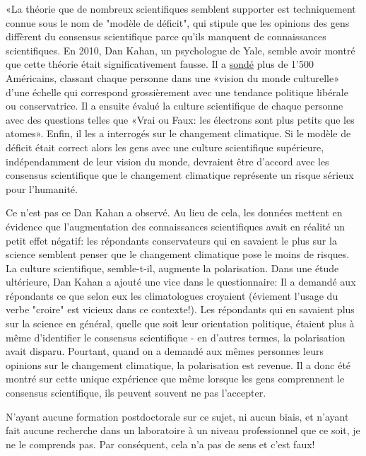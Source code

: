 	«La th\'eorie que de nombreux scientifiques semblent supporter est techniquement connue sous le nom de "modèle de d\'eficit", qui stipule que les opinions des gens diffèrent du consensus scientifique parce qu'ils manquent de connaissances scientifiques. En 2010, Dan Kahan, un psychologue de Yale, semble avoir montr\'e que cette th\'eorie \'etait significativement fausse. Il a \href{http://www.nature.com/nclimate/journal/v2/n10/full/nclimate1547.html}{{\color{blue} sond\'e}} plus de 1'500 Am\'ericains, classant chaque personne dans une «vision du monde culturelle» d'une \'echelle qui correspond grossièrement avec une tendance politique lib\'erale ou conservatrice. Il a ensuite \'evalu\'e la culture scientifique de chaque personne avec des questions telles que «Vrai ou Faux: les \'electrons sont plus petits que les atomes». Enfin, il les a interrog\'es sur le changement climatique. Si le modèle de d\'eficit \'etait correct alors les gens avec une culture scientifique sup\'erieure, ind\'ependamment de leur vision du monde, devraient être d'accord avec les consensus scientifique que le changement climatique repr\'esente un risque s\'erieux pour l'humanit\'e.
  
	Ce n'est pas ce Dan Kahan a observ\'e. Au lieu de cela, les donn\'ees mettent en \'evidence que l'augmentation des connaissances scientifiques avait en r\'ealit\'e un petit effet n\'egatif: les r\'epondants conservateurs qui en savaient le plus sur la science semblent penser que le changement climatique pose le moins de risques. La culture scientifique, semble-t-il, augmente la polarisation. Dans une \'etude ult\'erieure, Dan Kahan a ajout\'e une vice dans le questionnaire: Il a demand\'e aux r\'epondants ce que selon eux les climatologues croyaient (\'eviement l'usage du verbe "croire" est vicieux dans ce contexte!). Les r\'epondants qui en savaient plus sur la science en g\'en\'eral, quelle que soit leur orientation politique, \'etaient plus à même d'identifier le consensus scientifique - en d'autres termes, la polarisation avait disparu. Pourtant, quand on a demand\'e aux mêmes personnes leurs opinions sur le changement climatique, la polarisation est revenue. Il a donc \'et\'e montr\'e sur cette unique exp\'erience que même lorsque les gens comprennent le consensus scientifique, ils peuvent souvent ne pas l'accepter.
	
	\begin{fquote}N'ayant aucune formation postdoctorale sur ce sujet, ni aucun biais, et n'ayant fait aucune recherche dans un laboratoire à un niveau professionnel que ce soit, je ne le comprends pas. Par conséquent, cela n'a pas de sens et c'est faux!
 	\end{fquote}

